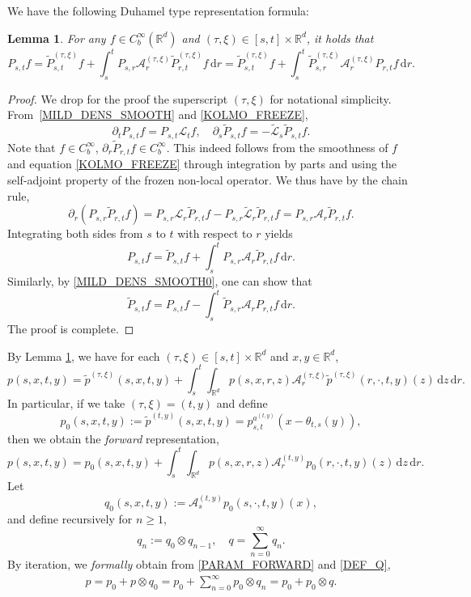 \documentclass[11pt]{article}
\numberwithin{equation}{section}\providecommand{\asymp}{\mathrel{\sim}}
\theoremstyle{plain}
\newtheorem{lemma}[theorem]{Lemma}
\theoremstyle{definition}
\let\p\partial
\let\wt\widetilde
\newcommand\mR{\mathbb{R}}
\newcommand\1{{\mathbf{1}}}
\newcommand\sA{{\mathscr A}}
\newcommand\sL{{\mathscr L}}
\newcommand{\dif}{\,\mathrm{d}}
\begin{document}
We have the following Duhamel type representation formula:
\begin{lemma}\label{Le310}
For any $f\in C_b^\infty(\mR^d)$ and $(\tau,\xi)\in[s,t]\times\mR^d$, it holds that
\[
P_{s,t}f=\widetilde P^{(\tau,\xi)}_{s,t}f+\int^t_sP_{s,r}\sA^{(\tau,\xi)}_r\widetilde P^{(\tau,\xi)}_{r,t}f\dif r
=\widetilde P^{(\tau,\xi)}_{s,t}f+\int^t_s\widetilde P^{(\tau,\xi)}_{s,r}\sA^{(\tau,\xi)}_rP_{r,t}f\dif r.
\]
\end{lemma}
\begin{proof}
We drop for the proof the superscript $(\tau,\xi)$ for notational simplicity. From~\eqref{MILD_DENS_SMOOTH} and \eqref{KOLMO_FREEZE},
\[
\p_t P_{s,t}f=P_{s,t}\sL_t f,\quad \p_s \widetilde P_{s,t}f=-\widetilde \sL_s\widetilde P_{s,t}f.
\]
Note that $f\in C_b^\infty$, $\partial_r \widetilde P_{r,t}f\in C^\infty_b$. {This indeed follows from the smoothness of $f$ and equation \eqref{KOLMO_FREEZE} through integration by parts and using the self-adjoint property of the frozen non-local operator}. We thus have by the chain rule,
\[
\p_r(P_{s,r}\widetilde P_{r,t}f)=P_{s,r}\sL_r\widetilde P_{r,t}f-P_{s,r}\wt\sL_r\widetilde P_{r,t}f
=P_{s,r}\sA_r\widetilde P_{r,t}f.
\]
Integrating both sides from $s$ to $t$ with respect to $r$ yields\vspace*{-3pt}
\[
P_{s,t}f=\widetilde P_{s,t}f+\int^t_sP_{s,r}\sA_r\widetilde P_{r,t}f\dif r.
\]
Similarly, by \eqref{MILD_DENS_SMOOTH0}, one can show that\vspace*{-3pt}
\[
\wt P_{s,t}f= P_{s,t}f-\int^t_s\widetilde P_{s,r}\sA_rP_{r,t}f\dif r.
\]
The proof is complete.
\end{proof}

By Lemma \ref{Le310}, we have for each $(\tau,\xi)\in[s,t]\times\mR^d$ and $x,y\in\mR^d$,
\[
p(s,x,t,y)
=\wt p^{(\tau,\xi)}(s,x,t,y)+
\int^t_s\int_{\mR^d}p(s,x,r,z)\sA^{(\tau,\xi)}_{r}\wt p^{(\tau,\xi)}(r,\cdot,t,y)(z)\dif z\dif r.
\]
In particular, if we take $(\tau,\xi)=(t,y)$ and define
\begin{equation}\label{Fre}
p_0(s,x,t,y):=\tilde p^{(t,y)}(s,x,t,y)= p_{{s,t}}^{a^{(t,y)}}(x-\theta_{t,s}(y)),
\end{equation}
then we obtain the {\it forward} representation,
\begin{equation}\label{PARAM_FORWARD}
p(s,x,t,y)
=p_0(s,x,t,y)+
\int^t_s\int_{\mR^d}p(s,x,r,z)\sA^{(t,y)}_{r}p_0(r,\cdot,t,y)(z)\dif z\dif r.
\end{equation}
Let\vspace*{-3pt}
\[
q_0(s,x,t,y):=\sA^{(t,y)}_{s}p_0(s,\cdot,t,y)(x),
\]
and define recursively for $n\ge 1 $,\vspace*{-3pt}
\begin{equation}\label{DEF_Q}
q_n:=q_0\otimes q_{n-1},\quad q=\sum_{n=0}^\infty q_n.
\end{equation}
By iteration, we \textit{formally} obtain from \eqref{PARAM_FORWARD} and \eqref{DEF_Q},
\begin{align}\label{Eq1}
p=p_0+p\otimes q_0=p_0+\sum_{n=0}^\infty p_0\otimes q_n=p_0+p_0\otimes q.
\end{align}
\end{document}
